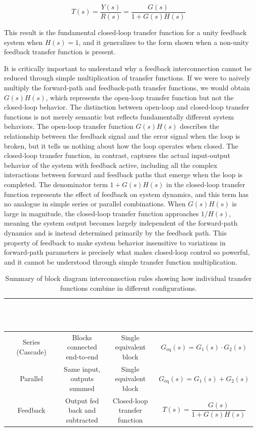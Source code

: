 \begin{equation}
T(s) = \frac{Y(s)}{R(s)} = \frac{G(s)}{1 + G(s)H(s)}
\end{equation}

This result is the fundamental closed-loop transfer function for a unity feedback system when $H(s) = 1$, and it generalizes to the form shown when a non-unity feedback transfer function is present.

It is critically important to understand why a feedback interconnection cannot be reduced through simple multiplication of transfer functions. If we were to naively multiply the forward-path and feedback-path transfer functions, we would obtain $G(s)H(s)$, which represents the open-loop transfer function but not the closed-loop behavior. The distinction between open-loop and closed-loop transfer functions is not merely semantic but reflects fundamentally different system behaviors. The open-loop transfer function $G(s)H(s)$ describes the relationship between the feedback signal and the error signal when the loop is broken, but it tells us nothing about how the loop operates when closed. The closed-loop transfer function, in contrast, captures the actual input-output behavior of the system with feedback active, including all the complex interactions between forward and feedback paths that emerge when the loop is completed. The denominator term $1 + G(s)H(s)$ in the closed-loop transfer function represents the effect of feedback on system dynamics, and this term has no analogue in simple series or parallel combinations. When $G(s)H(s)$ is large in magnitude, the closed-loop transfer function approaches $1/H(s)$, meaning the system output becomes largely independent of the forward-path dynamics and is instead determined primarily by the feedback path. This property of feedback to make system behavior insensitive to variations in forward-path parameters is precisely what makes closed-loop control so powerful, and it cannot be understood through simple transfer function multiplication.

\begin{table}[htbp]
\centering
\begin{tabular}{|c|c|c|c|}
\hline
\rowcolor{UofSCGarnet}
\textcolor{white}{\textbf{Configuration}} & \textcolor{white}{\textbf{Diagram Structure}} & \textcolor{white}{\textbf{Equivalent Transfer Function}} & \textcolor{white}{\textbf{Formula}} \\
\hline
Series (Cascade) & Blocks connected end-to-end & Single equivalent block & $G_{\text{eq}}(s) = G_1(s) \cdot G_2(s)$ \\
\hline
Parallel & Same input, outputs summed & Single equivalent block & $G_{\text{eq}}(s) = G_1(s) + G_2(s)$ \\
\hline
Feedback & Output fed back and subtracted & Closed-loop transfer function & $T(s) = \dfrac{G(s)}{1 + G(s)H(s)}$ \\
\hline
\end{tabular}
\captionsetup{justification=centering}
\caption{Summary of block diagram interconnection rules showing how individual transfer functions combine in different configurations.}
\end{table}

